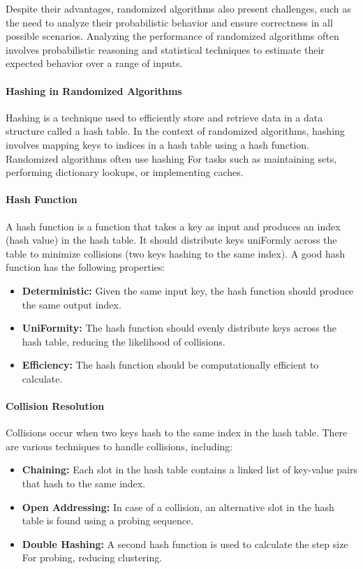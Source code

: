 \documentclass[12pt]{book} %
\begin{document}
Despite their advantages, randomized algorithms also present challenges, such as the need to analyze their probabilistic behavior and ensure correctness in all possible scenarios. Analyzing the performance of randomized algorithms often involves probabilistic reasoning and statistical techniques to estimate their expected behavior over a range of inputs.
\FloatBarrier
\paragraph{Hashing in Randomized Algorithms}

Hashing is a technique used to efficiently store and retrieve data in a data structure called a hash table. In the context of randomized algorithms, hashing involves mapping keys to indices in a hash table using a hash function. Randomized algorithms often use hashing For tasks such as maintaining sets, performing dictionary lookups, or implementing caches.

\paragraph{Hash Function}

A hash function is a function that takes a key as input and produces an index (hash value) in the hash table. It should distribute keys uniFormly across the table to minimize collisions (two keys hashing to the same index). A good hash function has the following properties:

\begin{itemize}
    \item \textbf{Deterministic:} Given the same input key, the hash function should produce the same output index.
    \item \textbf{UniFormity:} The hash function should evenly distribute keys across the hash table, reducing the likelihood of collisions.
    \item \textbf{Efficiency:} The hash function should be computationally efficient to calculate.
\end{itemize}

\paragraph{Collision Resolution}

Collisions occur when two keys hash to the same index in the hash table. There are various techniques to handle collisions, including:

\begin{itemize}
    \item \textbf{Chaining:} Each slot in the hash table contains a linked list of key-value pairs that hash to the same index.
    \item \textbf{Open Addressing:} In case of a collision, an alternative slot in the hash table is found using a probing sequence.
    \item \textbf{Double Hashing:} A second hash function is used to calculate the step size For probing, reducing clustering.
\end{itemize}
\end{document}
